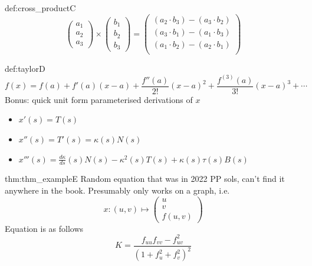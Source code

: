 \documentclass[landscape, 8pt]{extarticle}
\begin{document}
\begin{multicols}{3}
\begin{dfn}{def:cross_product}{C}
    \[
    \begin{pmatrix}
        a_{1} \\
        a_{2} \\
        a_{3}
    \end{pmatrix} \times \begin{pmatrix}
        b_{1} \\
        b_{2} \\
        b_{3}
    \end{pmatrix} = \begin{pmatrix}
        (a_{2} \cdot b_{3}) - (a_{3} \cdot b_{2}) \\
        (a_{3} \cdot b_{1}) - (a_{1} \cdot b_{3}) \\
        (a_{1} \cdot b_{2}) - (a_{2} \cdot b_{1}) \\
    \end{pmatrix}
    \]
\end{dfn}
\vspace{-5pt}

\begin{dfn}{def:taylor}{D}
\[f(x) = f(a) + f'(a)(x-a) + \frac{f''(a)}{2!}(x-a)^{2} + \frac{f^{(3)}(a)}{3!}(x-a)^{3}+ \cdots\]
Bonus: quick unit form parameterised derivations of \(x\)
\renewcommand\labelitemi{\tiny$\bullet$}
\begin{itemize}
    \setlength\itemsep{0em}
    \item \(x'(s) = T(s)\) \\
    \item \(x''(s) = T'(s) = \kappa(s)N(s)\) \\
    \item \(x'''(s) = \frac{d\kappa}{ds}(s)N(s) - \kappa^{2}(s)T(s) + \kappa(s)\tau(s)B(s)\)
\end{itemize}
\end{dfn}



\begin{dfn}{thm:thm_example}{E}
Random equation that was in 2022 PP sols, can't find it anywhere in the book. Presumably only works on a graph, i.e.
\[x : (u,v) \mapsto \begin{pmatrix}
    u \\
    v \\
    f(u,v)
\end{pmatrix}\]
Equation is as follows
\[K = \frac{f_{uu} f_{vv} - f_{uv}^{2}}{(1 + f^{2}_{u} + f^{2}_{v})^{2}}\]
\end{dfn}
\vspace{-5pt}


\end{multicols}
\end{document}
